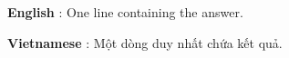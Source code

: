 \textbf{    English   }   : One line containing the answer.  

\textbf{    Vietnamese   }   : Một dòng duy nhất chứa kết quả.  

\